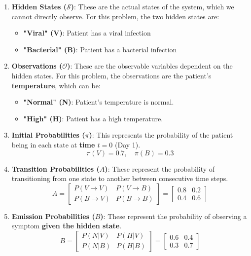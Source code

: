 \documentclass{article}
\begin{document}
\begin{enumerate}
    \item \textbf{Hidden States (\(\mathcal{S}\))}:  
    These are the actual states of the system, which we cannot directly observe.  
    For this problem, the two hidden states are:  
    \begin{itemize}
        \item \textbf{"Viral" (V)}: Patient has a viral infection  
        \item \textbf{"Bacterial" (B)}: Patient has a bacterial infection  
    \end{itemize}

    \item \textbf{Observations (\(\mathcal{O}\))}:  
    These are the observable variables dependent on the hidden states.  
    For this problem, the observations are the patient's \textbf{temperature}, which can be:
    \begin{itemize}
        \item \textbf{"Normal" (N)}: Patient's temperature is normal.
        \item \textbf{"High" (H)}: Patient has a high temperature.
    \end{itemize}

    \item \textbf{Initial Probabilities (\(\pi\))}:  
    This represents the probability of the patient being in each state at \textbf{time \( t = 0 \)} (Day 1).  
    \[
    \pi(V) = 0.7, \quad \pi(B) = 0.3
    \]

    \item \textbf{Transition Probabilities (\(A\))}:  
    These represent the probability of transitioning from one state to another between consecutive time steps.  
    \[
    A = 
    \begin{bmatrix}
    P(V \to V) & P(V \to B) \\
    P(B \to V) & P(B \to B)
    \end{bmatrix}
    =
    \begin{bmatrix}
    0.8 & 0.2 \\
    0.4 & 0.6
    \end{bmatrix}
    \]

    \item \textbf{Emission Probabilities (\(B\))}:  
    These represent the probability of observing a symptom \textbf{given the hidden state}.  
    \[
    B =
    \begin{bmatrix}
    P(N|V) & P(H|V) \\
    P(N|B) & P(H|B)
    \end{bmatrix}
    =
    \begin{bmatrix}
    0.6 & 0.4 \\
    0.3 & 0.7
    \end{bmatrix}
    \]
\end{enumerate}
\end{document}
